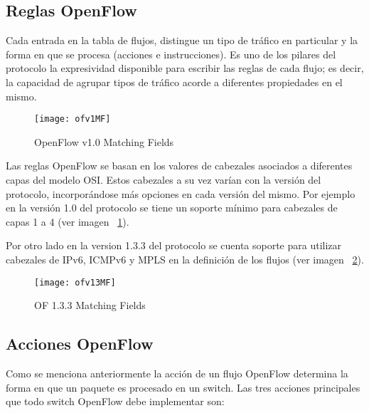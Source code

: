 \subsection{Reglas OpenFlow}
Cada entrada en la tabla de flujos, distingue un tipo de tr\'afico en particular y la forma en que se procesa (acciones e instrucciones). Es uno de los pilares del protocolo la expresividad disponible para escribir las reglas de cada flujo; es decir, la capacidad de agrupar tipos de tr\'afico acorde a diferentes propiedades en el mismo.\\

\begin{figure}[h] 
\centering    
\texttt{[image: ofv1MF]}
\caption[OF 1.0 Matching Fields]{OpenFlow v1.0 Matching Fields}
\label{fig:OF10MatchingFields}
\end{figure}

Las reglas OpenFlow se basan en los valores de cabezales asociados a diferentes capas del modelo OSI. Estos cabezales a su vez varían con la versi\'on del protocolo, incorporándose m\'as opciones en cada versi\'on del mismo. Por ejemplo en la versi\'on 1.0 del protocolo se tiene un soporte mínimo para cabezales de capas 1 a 4 (ver imagen ~\ref{fig:OF10MatchingFields}).

Por otro lado en la version 1.3.3 del protocolo se cuenta soporte para utilizar cabezales de IPv6, ICMPv6 y MPLS en la definición de los flujos (ver imagen ~\ref{fig:OF13MatchingFields}).
 
\begin{figure}[ht] 
\centering    
\texttt{[image: ofv13MF]}
\caption[OF 1.3.3 Matching Fields]{OF 1.3.3 Matching Fields}
\label{fig:OF13MatchingFields}
\end{figure}

\subsection{Acciones OpenFlow}

Como se menciona anteriormente la acci\'on de un flujo OpenFlow determina la forma en que un paquete es procesado en un switch. Las tres acciones principales que todo switch OpenFlow debe implementar son:


